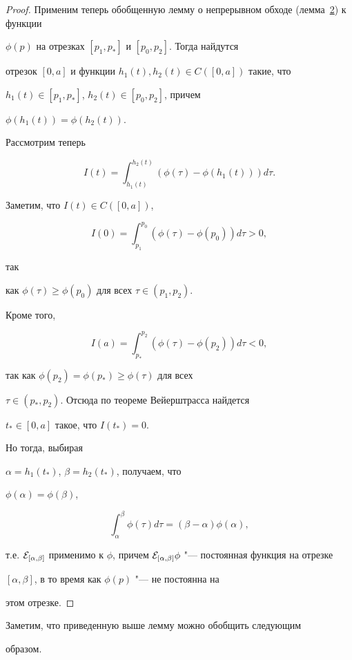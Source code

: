 \begin{proof}
Применим теперь обобщенную лемму о непрерывном обходе (лемма~\hyperlink{palin:lemma2}{2}) к функции

$\phi(p)$ на отрезках $[p_1,p_*]$ и $[p_0,p_2]$. Тогда найдутся

отрезок $[0,a]$ и функции $h_1(t),h_2(t)\in C([0,a])$ такие, что

$h_1(t)\in[p_1,p_*]$, $h_2(t)\in[p_0,p_2]$, причем

$\phi(h_1(t))=\phi(h_2(t))$. 



Рассмотрим теперь

$$

I(t)=\int _{h_1(t)}^{h_2(t)}\left(\phi(\tau)-\phi(h_1(t))\right)d\tau.

$$

Заметим, что $I(t)\in C([0,a])$,

$$I(0)=\int _{p_1}^{p_0}(\phi(\tau)-\phi(p_0))d\tau>0,$$ 

так

как $\phi(\tau)\ge\phi(p_0)$ для всех $\tau\in(p_1,p_2)$. 

Кроме того, 

$$I(a)=\int _{p_*}^{p_2}(\phi(\tau)-\phi(p_2))d\tau<0,$$

так как $\phi(p_2)=\phi(p_*)\ge\phi(\tau)$ для всех

$\tau\in(p_*,p_2)$. Отсюда по теореме Вейерштрасса найдется

$t_*\in[0,a]$ такое, что $I(t_*)=0$. 

Но тогда, выбирая

$\alpha=h_1(t_*)$, $\beta=h_2(t_*)$, получаем, что

$\phi(\alpha)=\phi(\beta)$,

$$\int _{\alpha}^{\beta}\phi(\tau)d\tau=(\beta-\alpha)\phi(\alpha),$$

т.е. ${\cal E}_{[\alpha,\beta]}$ применимо к $\phi$, причем ${\cal

E}_{[\alpha,\beta]}\phi$ "--- постоянная функция на отрезке

$[\alpha,\beta]$, в то время как $\phi(p)$ "--- не постоянна на

этом отрезке. \hfill

\end{proof}



\smallskip



Заметим, что приведенную выше лемму можно обобщить следующим

образом.



